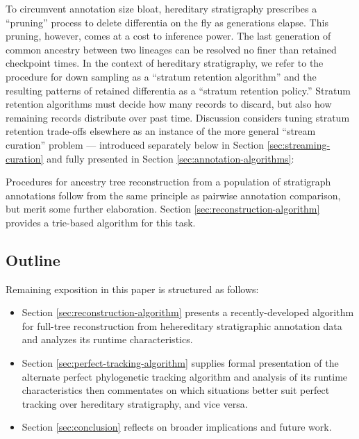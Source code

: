 To circumvent annotation size bloat, hereditary stratigraphy prescribes a ``pruning'' process to delete differentia on the fly as generations elapse.
This pruning, however, comes at a cost to inference power.
The last generation of common ancestry between two lineages can be resolved no finer than retained checkpoint times.
In the context of hereditary stratigraphy, we refer to the procedure for down sampling as a ``stratum retention algorithm'' and the resulting patterns of retained differentia as a ``stratum retention policy.''
Stratum retention algorithms must decide how many records to discard, but also how remaining records distribute over past time.
Discussion considers tuning stratum retention trade-offs elsewhere as an instance of the more general ``stream curation'' problem --- introduced separately below in Section \ref{sec:streaming-curation} and fully presented in Section \ref{sec:annotation-algorithms}:

Procedures for ancestry tree reconstruction from a population of stratigraph annotations follow from the same principle as pairwise annotation comparison, but merit some further elaboration.
Section \ref{sec:reconstruction-algorithm} provides a trie-based algorithm for this task.

\subsection{Outline}

Remaining exposition in this paper is structured as follows:
\begin{itemize}
\item Section \ref{sec:reconstruction-algorithm} presents a recently-developed algorithm for full-tree reconstruction from hehereditary stratigraphic annotation data and analyzes its runtime characteristics.
\item Section \ref{sec:perfect-tracking-algorithm} supplies formal presentation of the alternate perfect phylogenetic tracking algorithm and analysis of its runtime characteristics then commentates on which situations better suit perfect tracking over hereditary stratigraphy, and vice versa.
\item Section \ref{sec:conclusion} reflects on broader implications and future work.
\end{itemize}
